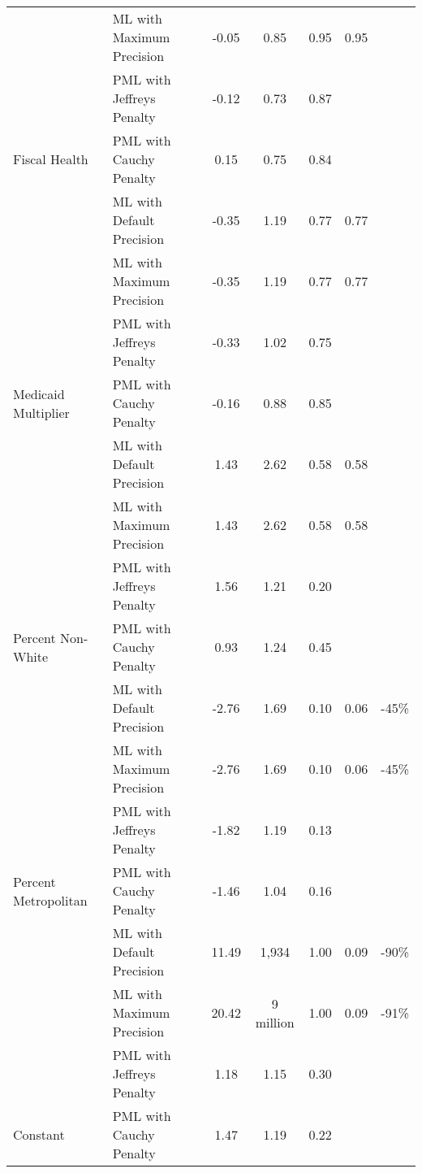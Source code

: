 \begin{tabular}{llccccc}
 & ML with Maximum Precision & -0.05 & 0.85 & 0.95 & 0.95 & \\

 & PML with Jeffreys Penalty & -0.12 & 0.73 & 0.87 &  & \\

\multirow{-4}{*}{\raggedright\arraybackslash Fiscal Health} & PML with Cauchy Penalty & 0.15 & 0.75 & 0.84 &  & \\
\cmidrule{1-7}
 & ML with Default Precision & -0.35 & 1.19 & 0.77 & 0.77 & \\

 & ML with Maximum Precision & -0.35 & 1.19 & 0.77 & 0.77 & \\

 & PML with Jeffreys Penalty & -0.33 & 1.02 & 0.75 &  & \\

\multirow{-4}{*}{\raggedright\arraybackslash Medicaid Multiplier} & PML with Cauchy Penalty & -0.16 & 0.88 & 0.85 &  & \\
\cmidrule{1-7}
 & ML with Default Precision & 1.43 & 2.62 & 0.58 & 0.58 & \\

 & ML with Maximum Precision & 1.43 & 2.62 & 0.58 & 0.58 & \\

 & PML with Jeffreys Penalty & 1.56 & 1.21 & 0.20 &  & \\

\multirow{-4}{*}{\raggedright\arraybackslash Percent Non-White} & PML with Cauchy Penalty & 0.93 & 1.24 & 0.45 &  & \\
\cmidrule{1-7}
 & ML with Default Precision & -2.76 & 1.69 & 0.10 & 0.06 & -45\%\\

 & ML with Maximum Precision & -2.76 & 1.69 & 0.10 & 0.06 & -45\%\\

 & PML with Jeffreys Penalty & -1.82 & 1.19 & 0.13 &  & \\

\multirow{-4}{*}{\raggedright\arraybackslash Percent Metropolitan} & PML with Cauchy Penalty & -1.46 & 1.04 & 0.16 &  & \\
\cmidrule{1-7}
 & ML with Default Precision & 11.49 & 1,934 & 1.00 & 0.09 & -90\%\\

 & ML with Maximum Precision & 20.42 & 9 million & 1.00 & 0.09 & -91\%\\

 & PML with Jeffreys Penalty & 1.18 & 1.15 & 0.30 &  & \\

\multirow{-4}{*}{\raggedright\arraybackslash Constant} & PML with Cauchy Penalty & 1.47 & 1.19 & 0.22 &  & \\
\bottomrule
\end{tabular}